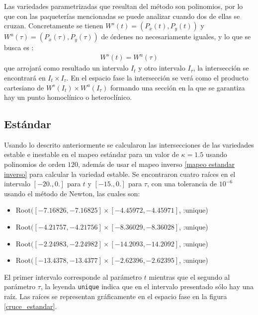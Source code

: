 Las variedades parametrizadas que resultan del método son polinomios, por lo que con las paqueterías  mencionadas se puede analizar cuando dos de ellas se cruzan. Concretamente se tienen  $W^{s}(t)=(P_{x}(t),P_{y}(t))$ y $W^{u}(\tau)=(P_{x}(\tau),P_{y}(\tau))$ de órdenes no necesariamente iguales, y lo que se busca es :
\begin{eqnarray}
W^{s}(t)=W^{u}(\tau)
\end{eqnarray}
que arrojará como resultado un intervalo $I_{t}$ y otro intervalo $I_{\tau}$, la intersección se encontrará en $I_{t}\times I_{\tau}$. En el espacio fase la intersección se verá como el producto cartesiano de $W^{s}(I_{t})\times W^{u}(I_{\tau})$ formando una sección en la que se garantiza hay un punto homoclínico o heteroclínico. 


\subsection{Estándar}
Usando lo descrito anteriormente se calcularon las intersecciones de las variedades estable e inestable en el mapeo estándar para un valor de $\kappa=1.5$ usando polinomios de orden $120$, además de usar el mapeo inverso \ref{mapeo estandar inverso} para calcular la variedad estable. Se encontraron cuatro raíces en el intervalo $[-20.,0.]$ para $t$  y $[-15.,0.]$ para $\tau$, con una tolerancia de $10^{-6}$ usando el método de Newton, las cuales son:
\begin{itemize}
\item Root$([-7.16826, -7.16825] \times [-4.45972, -4.45971]$, :unique)
\item Root$([-4.21757, -4.21756] \times [-8.36029, -8.36028]$, :unique)
\item Root$([-2.24983, -2.24982] \times [-14.2093, -14.2092]$, :unique)
\item Root$([-13.4378, -13.4377] \times [-2.62396, -2.62395]$, :unique)
\end{itemize}
El primer intervalo corresponde al parámetro $t$ mientras que el segundo al parámetro $\tau$, la leyenda \texttt{unique} indica que en el intervalo presentado sólo hay una raíz. Las raíces se representan gráficamente en el espacio fase en la figura \ref{cruce_estandar}. 

